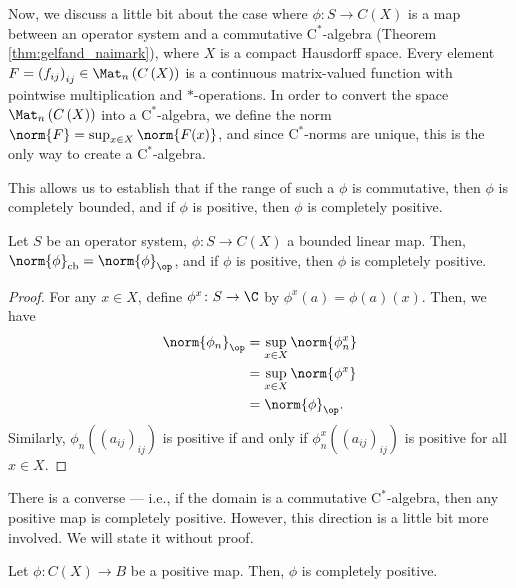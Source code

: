 Now, we discuss a little bit about the case where $\phi\colon S\rightarrow C\left( X \right)$ is a map between an operator system and a commutative $\mathrm{C}^{\ast}$-algebra (Theorem \ref{thm:gelfand_naimark}), where $X$ is a compact Hausdorff space. Every element $F = \left( f_{ij} \right)_{ij}\in \Mat_n\left( C\left( X \right) \right)$ is a continuous matrix-valued function with pointwise multiplication and $\ast$-operations. In order to convert the space $\Mat_n\left( C\left( X \right) \right)$ into a $\mathrm{C}^{\ast}$-algebra, we define the norm $\norm{F} = \sup_{x\in X}\norm{F(x)}$, and since $\mathrm{C}^{\ast}$-norms are unique, this is the only way to create a $\mathrm{C}^{\ast}$-algebra.\newline

This allows us to establish that if the range of such a $\phi$ is commutative, then $\phi$ is completely bounded, and if $\phi$ is positive, then $\phi$ is completely positive.
\begin{theorem}\label{thm:commutative_range_completely_positive}
  Let $S$ be an operator system, $\phi\colon S\rightarrow C(X)$ a bounded linear map. Then, $\norm{\phi}_{\cb} = \norm{\phi}_{\op}$, and if $\phi$ is positive, then $\phi$ is completely positive.
\end{theorem}
\begin{proof}
  For any $x\in X$, define $\phi^{x}\colon S\rightarrow \C$ by $\phi^x(a) = \phi(a)(x)$. Then, we have
  \begin{align*}
    \norm{\phi_n}_{\op} &= \sup_{x\in X}\norm{\phi_n^{x}}\\
                        &= \sup_{x\in X}\norm{\phi^{x}}\\
                        &= \norm{\phi}_{\op}.
  \end{align*}
  Similarly, $\phi_n\left( \left( a_{ij} \right)_{ij} \right)$ is positive if and only if $\phi_n^{x}\left( \left( a_{ij} \right)_{ij} \right)$ is positive for all $x\in X$.
\end{proof}
  There is a converse --- i.e., if the domain is a commutative $\mathrm{C}^{\ast}$-algebra, then any positive map is completely positive. However, this direction is a little bit more involved. We will state it without proof.
\begin{theorem}\label{thm:commutative_domain_completely_positive}
  Let $\phi\colon C\left( X \right)\rightarrow B$ be a positive map. Then, $\phi$ is completely positive.
\end{theorem}
